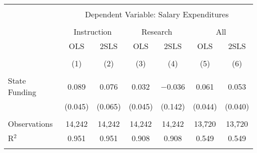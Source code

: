 
\begin{tabular}{@{\extracolsep{5pt}}lcccccc} 
\\[-1.8ex]\hline 
\hline \\[-1.8ex] 
 & \multicolumn{6}{c}{Dependent Variable: Salary Expenditures} \\ 
\cline{2-7} 
\\[-1.8ex] & \multicolumn{2}{c}{Instruction} & \multicolumn{2}{c}{Research} & \multicolumn{2}{c}{All} \\ 
 & OLS & 2SLS & OLS & 2SLS & OLS & 2SLS \\ 
\\[-1.8ex] & (1) & (2) & (3) & (4) & (5) & (6)\\ 
\hline \\[-1.8ex] 
 State Funding & 0.089 & 0.076 & 0.032 & $-$0.036 & 0.061 & 0.053 \\ 
  & (0.045) & (0.065) & (0.045) & (0.142) & (0.044) & (0.040) \\ 
 \hline \\[-1.8ex] 
Observations & 14,242 & 14,242 & 14,242 & 14,242 & 13,720 & 13,720 \\ 
R$^{2}$ & 0.951 & 0.951 & 0.908 & 0.908 & 0.549 & 0.549 \\ 
\hline 
\hline \\[-1.8ex] 
\end{tabular} 
